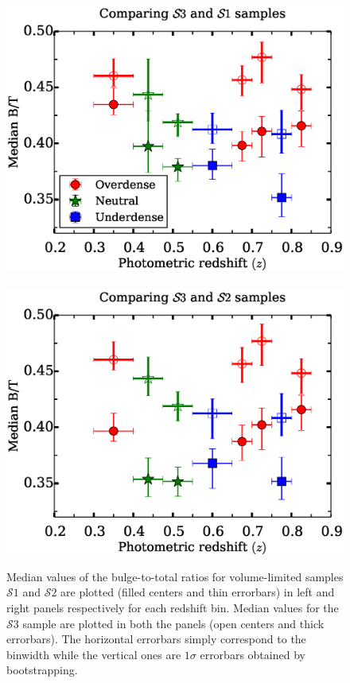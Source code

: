 \documentclass[twocolumn,useAMS,usenatbib]{mn2e}
\newcommand{\s}{\ensuremath{\mathcal{S}}}
\begin{document}
\begin{figure}
 \includegraphics[width=1.0\columnwidth]{median_dvcbtt} \
 \includegraphics[width=1.0\columnwidth]{median_dvcbtt2}
  \caption{ Median values of the bulge-to-total ratios for volume-limited samples \s$1$ and \s$2$ are plotted (filled centers and thin errorbars) in left and right panels respectively for each redshift bin.
          Median values for the \s$3$ sample are plotted in both the panels (open centers and thick errorbars).
          The horizontal errorbars simply correspond to the binwidth while the vertical ones are $1\sigma$ errorbars obtained by bootstrapping.}
 \label{fig:median_dvcbtt}
\end{figure}
\end{document}
